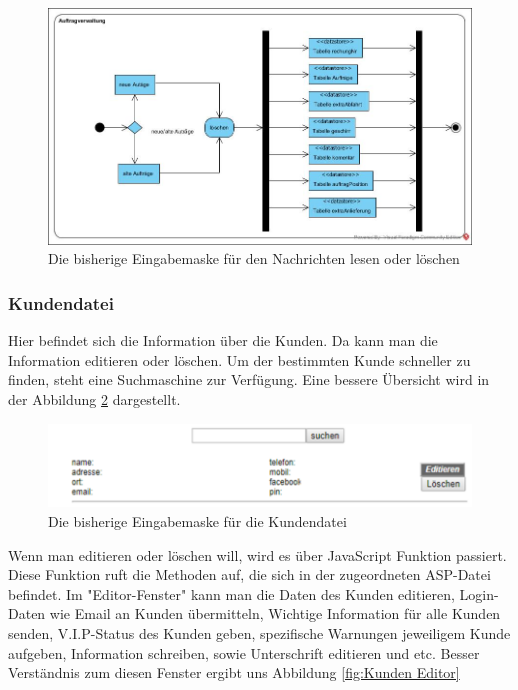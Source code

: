 \begin{figure}[h] 
	\centering
	\includegraphics[width=1\linewidth]{Graphics/Auftragverwaltung.jpg}
	\caption[auftragEinsehen]{Die bisherige Eingabemaske für den Nachrichten lesen oder löschen}
	\label{fig:auftragEinsehen}
\end{figure}

\pagebreak
\subsubsection{Kundendatei}

Hier befindet sich die Information über die Kunden. Da kann man die Information editieren oder löschen. Um der bestimmten Kunde schneller zu finden, steht eine Suchmaschine zur Verfügung. Eine bessere Übersicht wird in der Abbildung \ref{fig:KundenDatei} dargestellt. 

\begin{figure}[h]
	\centering
	\includegraphics[width=0.7\linewidth]{Graphics/kundenDatei.png}
	\caption[Kundeansicht]{Die bisherige Eingabemaske für die Kundendatei}
	\label{fig:KundenDatei}
\end{figure}

Wenn man editieren oder löschen will, wird es über JavaScript Funktion passiert. Diese Funktion ruft die Methoden auf, die sich in der zugeordneten ASP-Datei befindet. Im "Editor-Fenster" kann man die Daten des Kunden editieren, Login-Daten wie Email an Kunden übermitteln, Wichtige Information für alle Kunden senden, V.I.P-Status des Kunden geben, spezifische Warnungen jeweiligem Kunde aufgeben, Information schreiben, sowie Unterschrift editieren und etc. Besser Verständnis zum diesen Fenster ergibt uns Abbildung \ref{fig:Kunden Editor}


